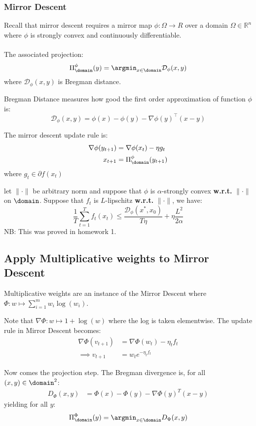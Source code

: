\subsubsection{Mirror Descent}
Recall that mirror descent requires a mirror map $\phi : \Omega \to R$ over a domain $\Omega \in \mathbb{R}^n$ where $\phi$ is strongly convex and continuously differentiable. \\
\\
The associated projection:
\begin{equation*}
    \Pi^\phi_\domain (y) = \argmin_{x\in\domain} \mathcal{D}_\phi(x,y)
\end{equation*}
where $\mathcal{D}_\phi(x,y)$ is Bregman distance.
\begin{definition}
    Bregman Distance measures how good the first order approximation of function $\phi$ is:
    \begin{equation*}
        \mathcal{D}_\phi(x,y) = \phi(x) - \phi(y) - \nabla \phi(y) ^\intercal (x-y)
    \end{equation*}
\end{definition}
The mirror descent update rule is:
\begin{align*}
    \nabla \phi(y_{t+1}) &= \nabla \phi (x_t) - \eta g_t \\
    x_{t+1} &=  \Pi^\phi_\domain (y_{t+1})
\end{align*}
where $g_t \in \partial f(x_t)$
\begin{theorem}
    let $\|\cdot\|$ be arbitrary norm and suppose that $\phi$ is $\alpha$-strongly convex      \textbf{w.r.t.} $\|\cdot\|$ on $\domain$. Suppose that $f_t$ is $L$-lipschitz \textbf{w.r.t.} $\|\cdot\|$, we have:
    \begin{equation*}
        \frac{1}{T}\sum^T_{t=1} f_t(x_t) \leq \frac{ \mathcal{D}_\phi(x^*,x_0)}{T \eta}+ \eta \frac{L^2}{2\alpha}
    \end{equation*}
NB: This was proved in homework 1.
\end{theorem}
\subsection{Apply Multiplicative weights to Mirror Descent}
Multiplicative weights are an instance of the Mirror Descent where $\Phi: w\mapsto \sum_{i=1}^m w_i \log(w_i)$.

Note that $\nabla\Phi : w\mapsto 1 + \log(w)$ where the log is taken elementwise.
The update rule in Mirror Descent becomes:
\begin{align*}
    \nabla\Phi(v_{t+1}) &=\nabla\Phi(w_{t}) - \eta_tf_t \\
    \implies v_{t+1} &= w_te^{-\eta_t f_t}
\end{align*}

Now comes the projection step. The Bregman divergence is, for all $(x,y)\in\domain^2$:
\begin{align*}
    D_{\Phi}(x,y) &= \Phi(x)-\Phi(y) - \nabla\Phi(y)^T(x-y)
\end{align*}
yielding for all $y$:
\begin{align*}
    \Pi_{\domain}^{\Phi}(y) = \argmin_{x\in\domain}D_{\Phi}(x,y)
\end{align*}